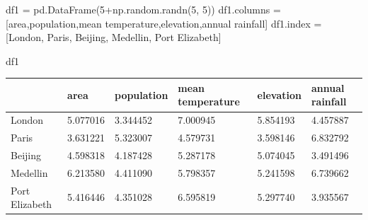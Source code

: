 \documentclass[
  letterpaper,
  DIV=11,
  numbers=noendperiod]{scrreprt}
\newenvironment{Shaded}{\begin{snugshade}}{\end{snugshade}}
\newcommand{\DecValTok}[1]{\textcolor[rgb]{0.68,0.00,0.00}{#1}}
\newcommand{\NormalTok}[1]{\textcolor[rgb]{0.00,0.23,0.31}{#1}}
\newcommand{\OperatorTok}[1]{\textcolor[rgb]{0.37,0.37,0.37}{#1}}
\newcommand{\StringTok}[1]{\textcolor[rgb]{0.13,0.47,0.30}{#1}}
\begin{document}
\begin{Shaded}
\begin{Highlighting}[]
\NormalTok{df1 }\OperatorTok{=}\NormalTok{ pd.DataFrame(}\DecValTok{5}\OperatorTok{+}\NormalTok{np.random.randn(}\DecValTok{5}\NormalTok{, }\DecValTok{5}\NormalTok{))}
\NormalTok{df1.columns }\OperatorTok{=}\NormalTok{ [}\StringTok{\textquotesingle{}area\textquotesingle{}}\NormalTok{,}\StringTok{\textquotesingle{}population\textquotesingle{}}\NormalTok{,}\StringTok{\textquotesingle{}mean temperature\textquotesingle{}}\NormalTok{,}\StringTok{\textquotesingle{}elevation\textquotesingle{}}\NormalTok{,}\StringTok{\textquotesingle{}annual rainfall\textquotesingle{}}\NormalTok{]}
\NormalTok{df1.index }\OperatorTok{=}\NormalTok{ [}\StringTok{\textquotesingle{}London\textquotesingle{}}\NormalTok{, }\StringTok{\textquotesingle{}Paris\textquotesingle{}}\NormalTok{, }\StringTok{\textquotesingle{}Beijing\textquotesingle{}}\NormalTok{, }\StringTok{\textquotesingle{}Medellin\textquotesingle{}}\NormalTok{, }\StringTok{\textquotesingle{}Port Elizabeth\textquotesingle{}}\NormalTok{]}
\end{Highlighting}
\end{Shaded}

\begin{Shaded}
\begin{Highlighting}[]
\NormalTok{df1}
\end{Highlighting}
\end{Shaded}

\begin{longtable}[]{@{}llllll@{}}
\toprule()
& area & population & mean temperature & elevation & annual rainfall \\
\midrule()
\endhead
London & 5.077016 & 3.344452 & 7.000945 & 5.854193 & 4.457887 \\
Paris & 3.631221 & 5.323007 & 4.579731 & 3.598146 & 6.832792 \\
Beijing & 4.598318 & 4.187428 & 5.287178 & 5.074045 & 3.491496 \\
Medellin & 6.213580 & 4.411090 & 5.798357 & 5.241598 & 6.739662 \\
Port Elizabeth & 5.416446 & 4.351028 & 6.595819 & 5.297740 & 3.935567 \\
\bottomrule()
\end{longtable}
\end{document}
